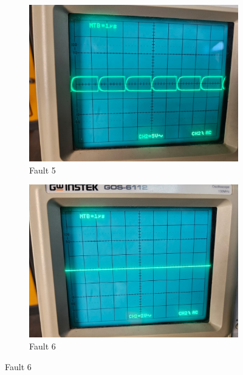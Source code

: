 \documentclass[a4paper,12pt]{article}
\begin{document}
\begin{figure}[H]
	
	\begin{subfigure}[t]{0.44\textwidth}
		\centering
		\includegraphics[width=1\linewidth]{Images/1.5}
		\caption{Fault 5}
		\vspace{0.1cm}
	\end{subfigure}
	\hfil
	\begin{subfigure}[t]{0.44\textwidth}
		\centering
		\includegraphics[width=1\linewidth]{Images/1.6}
		\caption{Fault 6}
		\vspace{0.1cm}
	\end{subfigure}
	

\end{figure}
\end{document}
